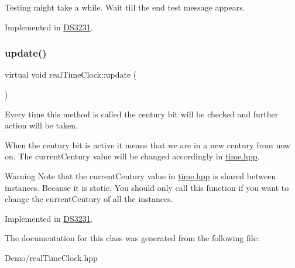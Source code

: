 Testing might take a while. Wait till the end test message appears. 

Implemented in \mbox{\hyperlink{class_d_s3231_aba65d7463036207d2a7c879d34dc827e}{D\+S3231}}.

\mbox{\label{classreal_time_clock_afb5132ca3cbe80552a88041cead0a2b3}} 
\subsubsection{\texorpdfstring{update()}{update()}}
{\footnotesize\ttfamily virtual void real\+Time\+Clock\+::update (\begin{DoxyParamCaption}{ }\end{DoxyParamCaption})\hspace{0.3cm}{\ttfamily [pure virtual]}}



Every time this method is called the century bit will be checked and further action will be taken. 

When the century bit is active it means that we are in a new century from now on. The current\+Century value will be changed accordingly in \mbox{\hyperlink{time_8hpp_source}{time.\+hpp}}. \begin{DoxyWarning}{Warning}
Note that the current\+Century value in \mbox{\hyperlink{time_8hpp_source}{time.\+hpp}} is shared between instances. Because it is static. You should only call this function if you want to change the current\+Century of all the instances. 
\end{DoxyWarning}


Implemented in \mbox{\hyperlink{class_d_s3231_a143ec57122d892ea0ec671a153352f2c}{D\+S3231}}.



The documentation for this class was generated from the following file\+:\begin{DoxyCompactItemize}
\item 
Demo/real\+Time\+Clock.\+hpp\end{DoxyCompactItemize}
